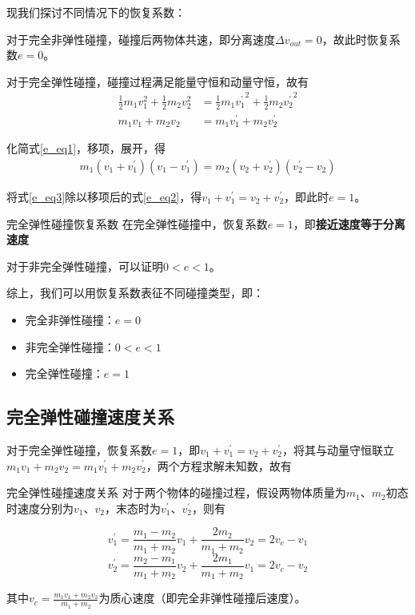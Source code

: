 现我们探讨不同情况下的恢复系数：

对于完全非弹性碰撞，碰撞后两物体共速，即分离速度$\Delta v_{out} = 0$，故此时恢复系数$e=0$。

对于完全弹性碰撞，碰撞过程满足能量守恒和动量守恒，故有
\begin{subequations}
\begin{align}
\label{e_eq1}
\frac{1}{2} m_1 v_1^2 + \frac{1}{2} m_2 v_2^2 &= \frac{1}{2} m_1 {v_1^{\prime}}^2 + \frac{1}{2} m_2 {v_2^{\prime}}^2 \\
\label{e_eq2}
m_1 v_1 + m_2 v_2 &= m_1 v_1^{\prime} + m_2 v_2^{\prime} 
\end{align}
\end{subequations}

化简式\eqref{e_eq1}，移项，展开，得
\begin{equation}
\begin{aligned}
m_1 (v_1 + v_1^{\prime})(v_1 - v_1^{\prime}) = m_2 (v_2 + v_2^{\prime})(v_2^{\prime} - v_2)  
\end{aligned}
\label{e_eq3}
\end{equation}

将式\eqref{e_eq3}除以移项后的式\eqref{e_eq2}，得$v_1 + v_1^{\prime} = v_2 + v_2^{\prime}$，即此时$e=1$。

\begin{theo}{完全弹性碰撞恢复系数}{}
在完全弹性碰撞中，恢复系数$e=1$，即\textbf{接近速度等于分离速度}
\end{theo}

对于非完全弹性碰撞，可以证明$0 < e <1$。

综上，我们可以用恢复系数表征不同碰撞类型，即：

\begin{itemize}
	\item 完全非弹性碰撞：$e = 0$
	\item 非完全弹性碰撞：$0 < e < 1$
	\item 完全弹性碰撞：$e = 1$
\end{itemize}

\subsection{完全弹性碰撞速度关系}

对于完全弹性碰撞，恢复系数$e=1$，即$v_1 + v_1^{\prime} = v_2 + v_2^{\prime}$，将其与动量守恒联立$m_1 v_1 + m_2 v_2 = m_1 v_1^{\prime} + m_2 v_2^{\prime}$，两个方程求解未知数，故有

\begin{theo}{完全弹性碰撞速度关系}{}
对于两个物体的碰撞过程，假设两物体质量为$m_1$、$m_2$初态时速度分别为$v_1$、$v_2$，末态时为$v_1^{\prime}$、$v_2^{\prime}$，则有

$$v_1^{\prime} = \frac{m_1 - m_2}{m_1 + m_2} v_1 + \frac{2 m_2}{m_1 + m_2} v_2 = 2 v_c - v_1$$
$$v_2^{\prime} = \frac{m_2 - m_1}{m_1 + m_2} v_2 + \frac{2 m_1}{m_1 + m_2} v_1 = 2 v_c - v_2$$

其中$v_c = \frac{m_1 v_1 + m_2 v_2}{m_1+m_2}$为质心速度（即完全非弹性碰撞后速度）。
\end{theo}

